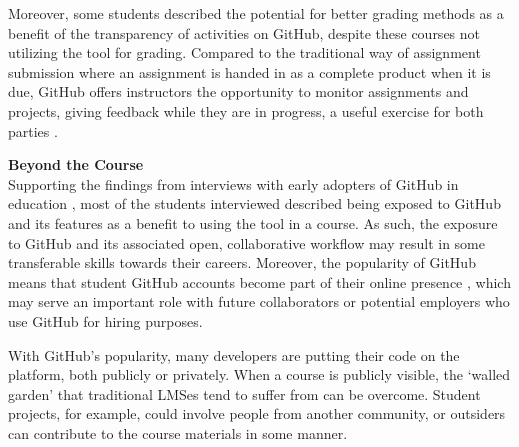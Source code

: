 Moreover, some students described the potential for better grading methods as a benefit of the transparency of activities on GitHub, despite these courses not utilizing the tool for grading. Compared to the traditional way of assignment submission where an assignment is handed in as a complete product when it is due, GitHub offers instructors the opportunity to monitor assignments and projects, giving feedback while they are in progress, a useful exercise for both parties \cite{glassy2006using}.

\textbf{Beyond the Course} \\
Supporting the findings from interviews with early adopters of GitHub in education \cite{zagalsky2015emergence}, most of the students interviewed described being exposed to GitHub and its features as a benefit to using the tool in a course. As such, the exposure to GitHub and its associated open, collaborative workflow may result in some transferable skills towards their careers. Moreover, the popularity of GitHub means that student GitHub accounts become part of their online presence \cite{marlow2013impression}, which may serve an important role with future collaborators or potential employers who use GitHub for hiring purposes.

With GitHub's popularity, many developers are putting their code on the platform, both publicly or privately. When a course is publicly visible, the `walled garden' that traditional LMSes tend to suffer from \cite{mott2010envisioning} can be overcome. Student projects, for example, could involve people from another community, or outsiders can contribute to the course materials in some manner. \\

%

